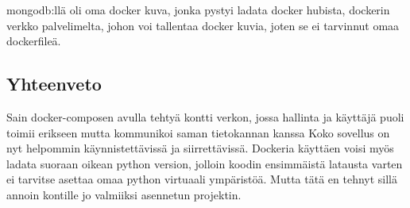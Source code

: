 mongodb:llä oli oma docker kuva, jonka pystyi ladata docker hubista, dockerin verkko palvelimelta, johon voi tallentaa docker kuvia, joten se ei tarvinnut omaa dockerfileä.
\medskip


\subsection*{Yhteenveto}

Sain docker-composen avulla tehtyä kontti verkon, jossa hallinta ja käyttäjä puoli toimii erikseen mutta kommunikoi saman tietokannan kanssa 
Koko sovellus on nyt helpommin käynnistettävissä ja siirrettävissä.
Dockeria käyttäen voisi myös ladata suoraan oikean python version, jolloin koodin ensimmäistä latausta varten ei tarvitse asettaa omaa python virtuaali ympäristöä. 
Mutta tätä en tehnyt sillä annoin kontille jo valmiiksi asennetun projektin.
